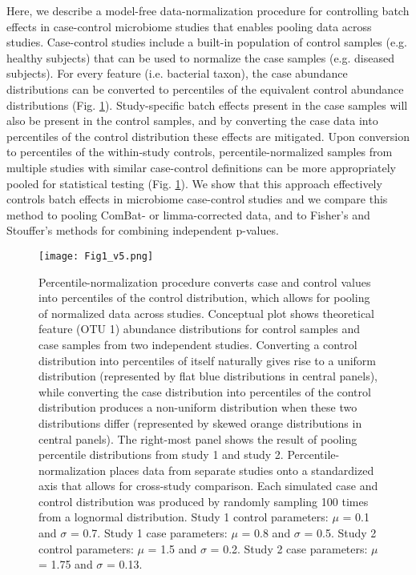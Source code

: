 Here, we describe a model-free data-normalization procedure for controlling batch effects in case-control microbiome studies that enables pooling data across studies.
Case-control studies include a built-in population of control samples (e.g. healthy subjects) that can be used to normalize the case samples (e.g. diseased subjects).
For every feature (i.e. bacterial taxon), the case abundance distributions can be converted to percentiles of the equivalent control abundance distributions (Fig. \ref{percnorm:fig1}).
Study-specific batch effects present in the case samples will also be present in the control samples, and by converting the case data into percentiles of the control distribution these effects are mitigated.
Upon conversion to percentiles of the within-study controls, percentile-normalized samples from multiple studies with similar case-control definitions can be more appropriately pooled for statistical testing (Fig. \ref{percnorm:fig1}).
We show that this approach effectively controls batch effects in microbiome case-control studies and we compare this method to pooling ComBat- or limma-corrected data, and to Fisher's and Stouffer's methods for combining independent p-values.

\begin{figure}[h]
\begin{center}
    \texttt{[image: Fig1\_v5.png]}
    \caption{Percentile-normalization procedure converts case and control values into percentiles of the control distribution, which allows for pooling of normalized data across studies. Conceptual plot shows theoretical feature (OTU 1) abundance distributions for control samples and case samples from two independent studies. Converting a control distribution into percentiles of itself naturally gives rise to a uniform distribution (represented by flat blue distributions in central panels), while converting the case distribution into percentiles of the control distribution produces a non-uniform distribution when these two distributions differ (represented by skewed orange distributions in central panels). The right-most panel shows the result of pooling percentile distributions from study 1 and study 2. Percentile-normalization places data from separate studies onto a standardized axis that allows for cross-study comparison. Each simulated case and control distribution was produced by randomly sampling 100 times from a lognormal distribution. Study 1 control parameters: $\mu$ = 0.1 and $\sigma$ = 0.7. Study 1 case parameters: $\mu$ = 0.8 and $\sigma$ = 0.5. Study 2 control parameters: $\mu$ = 1.5 and $\sigma$ = 0.2. Study 2 case parameters: $\mu$ = 1.75 and $\sigma$ = 0.13.}\label{percnorm:fig1}
\end{center}
\end{figure}

